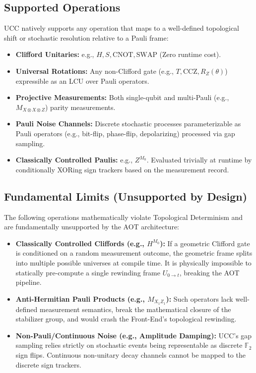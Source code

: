 \documentclass[11pt]{article}
\begin{document}
\subsection{Supported Operations}
UCC natively supports any operation that maps to a well-defined topological shift or stochastic resolution relative to a Pauli frame:
\begin{itemize}
    \item \textbf{Clifford Unitaries:} e.g., $H, S, \text{CNOT}, \text{SWAP}$ (Zero runtime cost).
    \item \textbf{Universal Rotations:} Any non-Clifford gate (e.g., $T, \text{CCZ}, R_Z(\theta)$) expressible as an LCU over Pauli operators.
    \item \textbf{Projective Measurements:} Both single-qubit and multi-Pauli (e.g., $M_{X \otimes X \otimes Z}$) parity measurements.
    \item \textbf{Pauli Noise Channels:} Discrete stochastic processes parameterizable as Pauli operators (e.g., bit-flip, phase-flip, depolarizing) processed via gap sampling.
    \item \textbf{Classically Controlled Paulis:} e.g., $Z^{M_0}$. Evaluated trivially at runtime by conditionally XORing sign trackers based on the measurement record.
\end{itemize}

\subsection{Fundamental Limits (Unsupported by Design)}
The following operations mathematically violate Topological Determinism and are fundamentally unsupported by the AOT architecture:
\begin{itemize}
    \item \textbf{Classically Controlled Cliffords (e.g., $H^{M_0}$):} If a geometric Clifford gate is conditioned on a random measurement outcome, the geometric frame splits into multiple possible universes at compile time. It is physically impossible to statically pre-compute a single rewinding frame $U_{0 \to t}$, breaking the AOT pipeline.
    \item \textbf{Anti-Hermitian Pauli Products (e.g., $M_{X_1 Z_1}$):} Such operators lack well-defined measurement semantics, break the mathematical closure of the stabilizer group, and would crash the Front-End's topological rewinding.
    \item \textbf{Non-Pauli/Continuous Noise (e.g., Amplitude Damping):} UCC's gap sampling relies strictly on stochastic events being representable as discrete $\mathbb{F}_2$ sign flips. Continuous non-unitary decay channels cannot be mapped to the discrete sign trackers.
\end{itemize}
\end{document}
